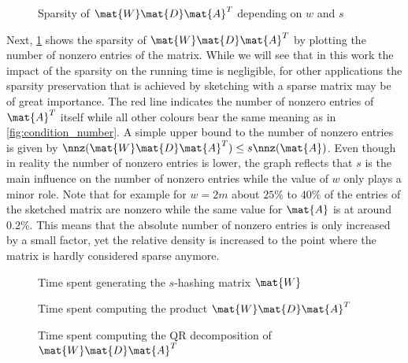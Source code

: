 \begin{figure}[tbp]%
  \centering%
  \caption{Sparsity of \(\mat{W}\mat{D}\mat{A}^T\) depending on \(w\) and \(s\)}%
  \label{fig:sparsity}
\end{figure}%

Next, \cref{fig:sparsity} shows the sparsity of \(\mat{W}\mat{D}\mat{A}^T\) by plotting the number of nonzero entries of the matrix.
While we will see that in this work the impact of the sparsity on the running time is negligible, for other applications the sparsity preservation that is achieved by sketching with a sparse matrix may be of great importance.
The red line indicates the number of nonzero entries of \(\mat{A}^T\) itself while all other colours bear the same meaning as in \cref{fig:condition_number}.
A simple upper bound to the number of nonzero entries is given by \(\nnz(\mat{W}\mat{D}\mat{A}^T) \leq s \nnz(\mat{A})\).
Even though in reality the number of nonzero entries is lower, the graph reflects that \(s\) is the main influence on the number of nonzero entries while the value of \(w\) only plays a minor role.
Note that for example for \(w = 2m\) about \(25\%\) to \(40\%\) of the entries of the sketched matrix are nonzero while the same value for \(\mat{A}\) is at around \(0.2\%\).
This means that the absolute number of nonzero entries is only increased by a small factor, yet the relative density is increased to the point where the matrix is hardly considered sparse anymore.

\begin{figure}[tbp]
  \centering
  \caption{Time spent generating the \(s\)-hashing matrix \(\mat{W}\)}%
  \label{fig:generate_sketch_duration}
\end{figure}

\begin{figure}[tbp]
  \centering%
  \caption{Time spent computing the product \(\mat{W}\mat{D}\mat{A}^T\)}%
  \label{fig:sketching_duration}
\end{figure}

\begin{figure}[tbp]
  \centering%
  \caption{Time spent computing the QR decomposition of \(\mat{W}\mat{D}\mat{A}^T\)}%
  \label{fig:decomposition_duration}
\end{figure}

